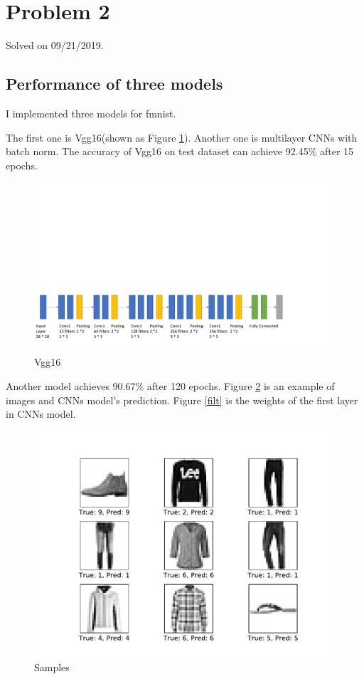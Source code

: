 \documentclass{article}
\begin{document}
\section{Problem 2}
Solved on 09/21/2019. 

\subsection{Performance of three models}
I implemented three models for fmnist. 

The first one is Vgg16(shown as Figure \ref{vgg}). Another one is multilayer CNNs with batch norm. The accuracy of Vgg16 on test dataset can achieve 92.45\% after 15 epochs. 
\begin{figure}[!h]
  \centering
  \includegraphics[scale=0.5]{imgs/vgg.pdf}
  \caption{Vgg16}
  \label{vgg}
\end{figure}

Another model achieves 90.67\% after 120 epochs. Figure \ref{res} is an example of images and CNNs model's prediction. Figure \ref{filt} is the weights of the first layer in CNNs model. 
\begin{figure}[!h]
  \centering
  \includegraphics[scale=0.4]{imgs/result.pdf}
  \caption{Samples}
  \label{res}
\end{figure}
\end{document}
